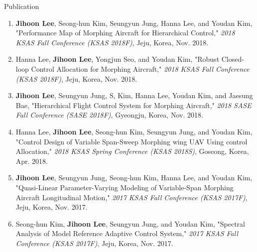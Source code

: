 \documentclass{resume}
\begin{document}
\begin{rSection}{Publication}
\begin{enumerate}
		\item \textbf{Jihoon Lee}, Seong-hun Kim, Seungyun Jung, Hanna Lee, and Youdan Kim, "Performance Map of Morphing Aircraft for Hierarchical Control," \textit{2018 KSAS Fall Conference (KSAS 2018F)}, Jeju, Korea, Nov. 2018. 
		
		\item Hanna Lee, \textbf{Jihoon Lee}, Yongjun Seo, and Youdan Kim, "Robust Closed-loop Control Allocation for Morphing Aircraft," \textit{2018 KSAS Fall Conference (KSAS 2018F)}, Jeju, Korea, Nov. 2018. 
		
		\item \textbf{Jihoon Lee}, Seungyun Jung, S, Kim, Hanna Lee, Youdan Kim, and Jaesung Bae, "Hierarchical Flight Control System for Morphing Aircraft," \textit{2018 SASE Fall Conference (SASE 2018F)}, Gyeongju, Korea, Nov. 2018. 
		\newline[\href{http://sase.or.kr/publication/fileopen2.asp?f_v=2035}{Link}] 
		
		\item Hanna Lee, \textbf{Jihoon Lee}, Seong-hun Kim, Seungyun Jung, and Youdan Kim, "Control Design of Variable Span-Sweep Morphing wing UAV Using control Allocation," \textit{2018 KSAS Spring Conference (KSAS 2018S)}, Goseong, Korea, Apr. 2018. 
		
		\item \textbf{Jihoon Lee}, Seungyun Jung, Seong-hun Kim, Hanna Lee, and Youdan Kim, "Quasi-Linear Parameter-Varying Modeling of Variable-Span Morphing Aircraft Longitudinal Motion," \textit{2017 KSAS Fall Conference (KSAS 2017F)}, Jeju, Korea, Nov. 2017. 

		\item Seong-hun Kim, \textbf{Jihoon Lee}, Seungyun Jung, and Youdan Kim, "Spectral Analysis of Model Reference Adaptive Control System," \textit{2017 KSAS Fall Conference (KSAS 2017F)}, Jeju, Korea, Nov. 2017. 
		

\end{enumerate}
\end{rSection}
\end{document}
